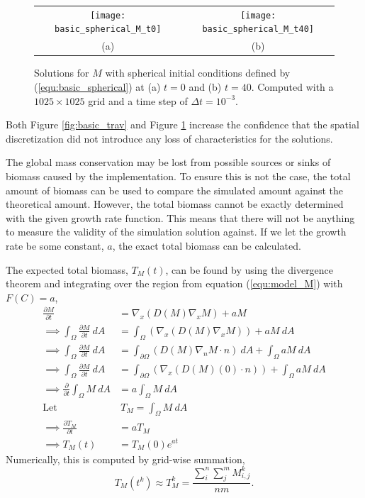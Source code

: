 \begin{figure}
  \centering
  \begin{tabular}{c c}
    \texttt{[image: basic\_spherical\_M\_t0]} & 
    \texttt{[image: basic\_spherical\_M\_t40]} \\
    (a) & (b)
  \end{tabular}
  \caption{Solutions for $M$ with spherical initial conditions defined by (\ref{equ:basic_spherical}) at (a) $t = 0$ and (b) $t = 40$. Computed with a $1025 \times 1025$ grid and a time step of $\Delta t = 10^{-3}$.}
  \label{fig:basic_spherical}
\end{figure}

Both Figure \ref{fig:basic_trav} and Figure \ref{fig:basic_spherical} increase the confidence that the spatial discretization did not introduce any loss of characteristics for the solutions.
  
The global mass conservation may be lost from possible sources or sinks of biomass caused by the implementation.
To ensure this is not the case, the total amount of biomass can be used to compare the simulated amount against the theoretical amount. 
However, the total biomass cannot be exactly determined with the given growth rate function.
This means that there will not be anything to measure the validity of the simulation solution against.
If we let the growth rate be some constant, $a$, the exact total biomass can be calculated.

The expected total biomass, $T_M(t)$, can be found by using the divergence theorem and integrating over the region from equation (\ref{equ:model_M}) with $F(C) = a$,
\begin{equation} \label{equ:total_biomass}
\begin{aligned}
  \frac{\partial M}{\partial t} &= \nabla_x(D(M) \nabla_x M) + aM \\
  \implies \int_{\Omega} \frac{\partial M}{\partial t} \ dA &= \int_{\Omega}(\nabla_x(D(M) \nabla_x M)) + aM \ dA \\
  \implies \int_{\Omega} \frac{\partial M}{\partial t} \ dA &= \int_{\partial \Omega}(D(M) \nabla_n M \cdot n)\ dA + \int_{\Omega}aM \ dA \\
  \implies \int_{\Omega} \frac{\partial M}{\partial t} \ dA &= \int_{\partial \Omega}(\nabla_x(D(M) (0) \cdot n)) + \int_{\Omega }aM \ dA \\
  \implies \frac{\partial}{\partial t} \int_{\Omega} M \ dA &= a \int_{\Omega} M \ dA \\
  \text{Let }&\ T_M = \int_{\Omega} M \ dA \\
  \implies \frac{\partial T_M}{\partial t} &= a T_M \\
  \implies T_M(t) &= T_M(0) e^{at}
\end{aligned}
\end{equation}
Numerically, this is computed by grid-wise summation,
\begin{equation}
  T_{M}(t^k) \approx T_{M}^{k} = \frac{ \sum^n_i \sum^m_j M^{k}_{i,j} }{nm}.
\end{equation}

